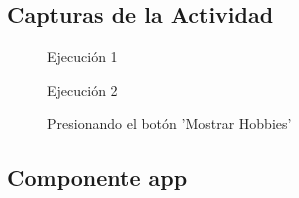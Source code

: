 \documentclass{article}
\begin{document}
  \subsection{Capturas de la Actividad}
  \begin{figure}[H]
    \centering
    \caption{Ejecución 1}
  \end{figure}
  \begin{figure}[H]
    \centering
    \caption{Ejecución 2}
  \end{figure}
  \begin{figure}[H]
    \centering
    \caption{Presionando el botón 'Mostrar Hobbies'}
  \end{figure}
  

  \subsection{Componente app}
  
\end{document}
